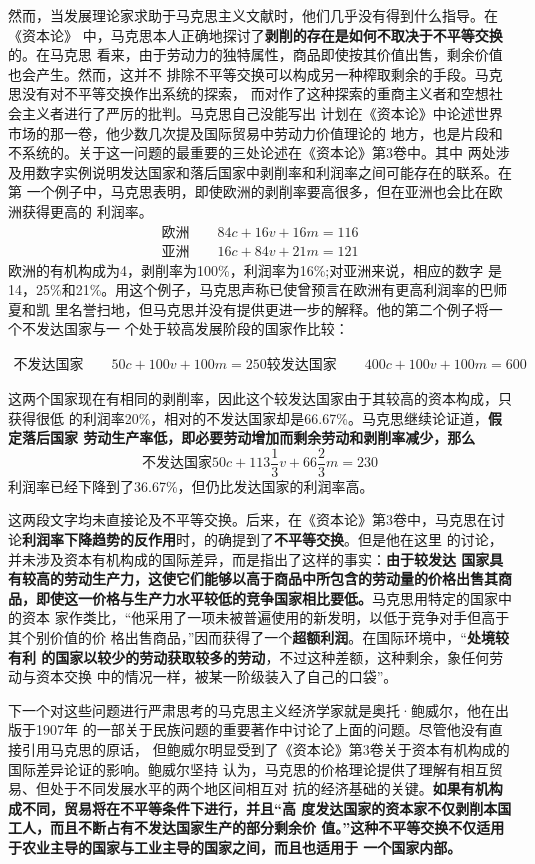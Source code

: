 然而，当发展理论家求助于马克思主义文献时，他们几乎没有得到什么指导。在《资本论》
中，马克思本人正确地探讨了\textbf{剥削的存在是如何不取决于不平等交换}的。在马克思
看来，由于劳动力的独特属性，商品即使按其价值出售，剩余价值也会产生。然而，这并不
排除不平等交换可以构成另一种榨取剩余的手段。马克思没有对不平等交换作出系统的探索，
而对作了这种探索的重商主义者和空想社会主义者进行了严厉的批判。马克思自己没能写出
计划在《资本论》中论述世界市场的那一卷，他少数几次提及国际贸易中劳动力价值理论的
地方，也是片段和不系统的。关于这一问题的最重要的三处论述在《资本论》第3卷中。其中
两处涉及用数字实例说明发达国家和落后国家中剥削率和利润率之间可能存在的联系。在第
一个例子中，马克思表明，即使欧洲的剥削率要高很多，但在亚洲也会比在欧洲获得更高的
利润率。
\begin{gather*}
欧洲\qquad 84c+16v+16m=116 \\
亚洲\qquad 16c+84v+21m=121
\end{gather*}
欧洲的有机构成为4，剥削率为100\%，利润率为16\%;对亚洲来说，相应的数字
是14，25\%和21\%。用这个例子，马克思声称已使曾预言在欧洲有更高利润率的巴师夏和凯
里名誉扫地，但马克思并没有提供更进一步的解释。他的第二个例子将一个不发达国家与一
个处于较高发展阶段的国家作比较：

\begin{gather*}
不发达国家\qquad 50c+100v+100m=250
较发达国家\qquad 400c+100v+100m=600
\end{gather*}

这两个国家现在有相同的剥削率，因此这个较发达国家由于其较高的资本构成，只获得很低
的利润率20\%，相对的不发达国家却是66.67\%。马克思继续论证道，\textbf{假定落后国家
  劳动生产率低，即必要劳动增加而剩余劳动和剥削率减少，那么}
\[不发达国家50c+113\frac{1}{3}v+66\frac{2}{3}m=230\]
利润率已经下降到了36.67\%，但仍比发达国家的利润率高。

这两段文字均未直接论及不平等交换。后来，在《资本论》第3卷中，马克思在讨
论\textbf{利润率下降趋势的反作用}时，的确提到了\textbf{不平等交换}。但是他在这里
的讨论，并未涉及资本有机构成的国际差异，而是指出了这样的事实：\textbf{由于较发达
  国家具有较高的劳动生产力，这使它们能够以高于商品中所包含的劳动量的价格出售其商
  品，即使这一价格与生产力水平较低的竞争国家相比要低。}马克思用特定的国家中的资本
家作类比，“他采用了一项未被普遍使用的新发明，以低于竞争对手但高于其个别价值的价
格出售商品，”因而获得了一个\textbf{超额利润}。在国际环境中，“\textbf{处境较有利
  的国家以较少的劳动获取较多的劳动}，不过这种差额，这种剩余，象任何劳动与资本交换
中的情况一样，被某一阶级装入了自己的口袋”。

下一个对这些问题进行严肃思考的马克思主义经济学家就是奥托·鲍威尔，他在出版于1907年
的一部关于民族问题的重要著作中讨论了上面的问题。尽管他没有直接引用马克思的原话，
但鲍威尔明显受到了《资本论》第3卷关于资本有机构成的国际差异论证的影响。鲍威尔坚持
认为，马克思的价格理论提供了理解有相互贸易、但处于不同发展水平的两个地区间相互对
抗的经济基础的关键。\textbf{如果有机构成不同，贸易将在不平等条件下进行，并且“高
  度发达国家的资本家不仅剥削本国工人，而且不断占有不发达国家生产的部分剩余价
  值。”这种不平等交换不仅适用于农业主导的国家与工业主导的国家之间，而且也适用于
  一个国家内部。}

